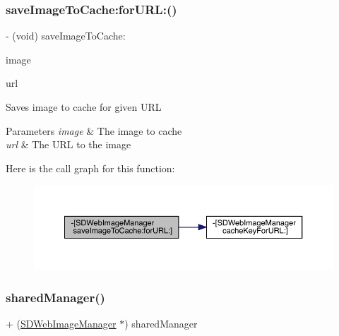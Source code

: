 \subsubsection{\texorpdfstring{save\+Image\+To\+Cache\+:for\+U\+R\+L\+:()}{saveImageToCache:forURL:()}\hspace{0.1cm}{\footnotesize\ttfamily [3/3]}}
{\footnotesize\ttfamily -\/ (void) save\+Image\+To\+Cache\+: \begin{DoxyParamCaption}\item[{(U\+I\+Image $\ast$)}]{image }\item[{forURL:(N\+S\+U\+RL $\ast$)}]{url }\end{DoxyParamCaption}}

Saves image to cache for given U\+RL


\begin{DoxyParams}{Parameters}
{\em image} & The image to cache \\
\hline
{\em url} & The U\+RL to the image \\
\hline
\end{DoxyParams}
Here is the call graph for this function\+:\nopagebreak
\begin{figure}[H]
\begin{center}
\leavevmode
\includegraphics[width=350pt]{interface_s_d_web_image_manager_acd286f805e3334824648122fd213937e_cgraph}
\end{center}
\end{figure}
\mbox{\label{interface_s_d_web_image_manager_a5b1936f0aaad5bc7b6cb470f46ac173f}} 
\subsubsection{\texorpdfstring{shared\+Manager()}{sharedManager()}\hspace{0.1cm}{\footnotesize\ttfamily [1/3]}}
{\footnotesize\ttfamily + (\mbox{\hyperlink{interface_s_d_web_image_manager}{S\+D\+Web\+Image\+Manager}} $\ast$) shared\+Manager \begin{DoxyParamCaption}{ }\end{DoxyParamCaption}}

